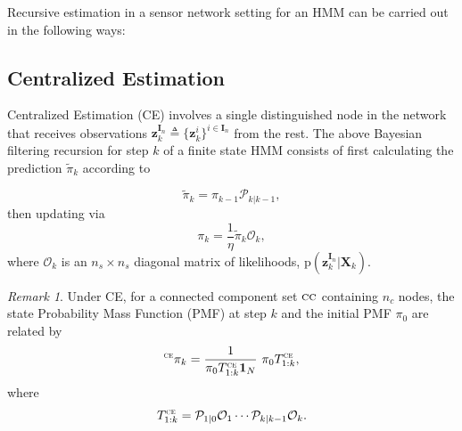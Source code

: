 \documentclass[journal]{IEEEtran}
\theoremstyle{remark}
\newtheorem{remark}{Remark}
\newcommand{\pr}{\textrm{p}}
\newcommand{\XX}[3][2]{\mathbf{X}_{  #2}^{ #3}}
\newcommand{\bIn}{\boldsymbol{I}_{{n}}}
\newcommand{\zz}[3][2]{\mathbf{z}_{ #2}^{ #3}}
\newcommand{\suf}[1]{\textsc{\tiny #1}}  %
\theoremstyle{definition}
\begin{document}
Recursive estimation in a sensor network setting for an HMM
can be carried out in the following ways:

\subsection{Centralized Estimation}

Centralized Estimation (CE) involves a single distinguished node in the
network that receives observations $\zz{k}{\bIn} \triangleq
\{\zz{k}{i}\}^{i\in\bIn}$ from the rest. The above Bayesian filtering recursion
for step $k$ of a finite state HMM consists of first calculating the prediction
$\tilde{\pi}_{k}$ according to 

\begin{equation}
\label{eq:pred}
\tilde{\pi}_{k} =  \pi_{k-1}\mathcal{P}_{k \vert k-1},
\end{equation}
then updating via
\begin{equation}
\label{eq:update}
{\pi}_{k} = \frac{1}{\eta}\tilde{\pi}_{k} \mathcal{O}_k,
\end{equation}
where $\mathcal{O}_k$ is an $n_s\times n_s$ diagonal matrix of likelihoods, $\pr(\zz{k}{\bIn}| \XX[]{k}{})$.  

\begin{remark}
 Under CE, for a connected component set $\textsc{cc}$ containing $n_{c}$ nodes, 
 the state Probability Mass Function (PMF) at step $k$ and the initial PMF $\pi_{0}$ are
 related by
 \begin{equation}
 {}^{\suf{CE}}{\pi}_{k} = \frac{1}{{\pi}_{0}T_{1:k}^{\suf{CE}}\mathbf{1}_N}\,\,{\pi_{0}}T_{1:k}^{\suf{CE}},\label{CE-UPDATE} 
 \end{equation}
 where  
 \begin{equation}
 {T}_{1:k}^{\suf{CE}} =\mathcal{P}_{1\vert0}\mathcal{O}_{1}\cdots\mathcal{P}_{k\vert k-1}\mathcal{O}_{k}.
 \end{equation}
\end{remark}
\end{document}
